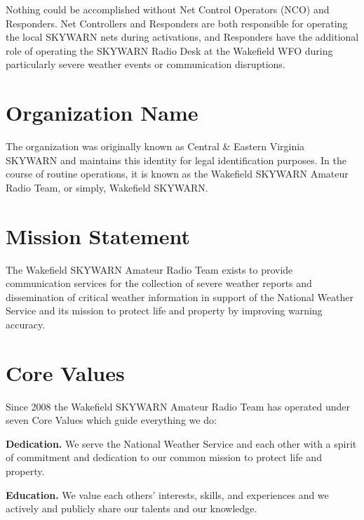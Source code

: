 \documentclass[pdflatex,letterpaper,twoside,12pt]{book}
\begin{document}
Nothing could be accomplished without Net Control Operators (NCO) and Responders.  Net Controllers and Responders are both responsible for operating the local SKYWARN nets during activations, and Responders have the additional role of operating the SKYWARN Radio Desk at the Wakefield WFO during particularly severe weather events or communication disruptions.


\section{Organization Name}

The organization was originally known as Central \& Eastern Virginia SKYWARN and maintains this identity for legal identification purposes.  In the course of routine operations, it is known as the Wakefield SKYWARN Amateur Radio Team, or simply, Wakefield SKYWARN.


\section{Mission Statement}

The Wakefield SKYWARN Amateur Radio Team exists to provide communication services for the collection of severe weather reports and dissemination of critical weather information in support of the National Weather Service and its mission to protect life and property by improving warning accuracy.


\section{Core Values}

Since 2008 the Wakefield SKYWARN Amateur Radio Team has operated under seven Core Values which guide everything we do:

\textbf{Dedication.} We serve the National Weather Service and each other with a spirit of commitment and dedication to our common mission to protect life and property.

\textbf{Education.} We value each others' interests, skills, and experiences and we actively and publicly share our talents and our knowledge.
\end{document}
